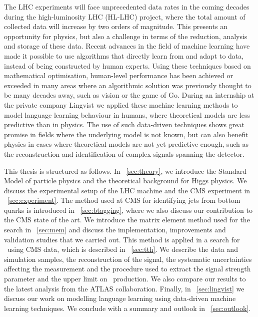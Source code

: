 The LHC experiments will face unprecedented data rates in the coming decades during the high-luminosity LHC (HL-LHC) project, where the total amount of collected data will increase by two orders of magnitude. This presents an opportunity for physics, but also a challenge in terms of the reduction, analysis and storage of these data. Recent advances in the field of machine learning have made it possible to use algorithms that directly learn from and adapt to data, instead of being constructed by human experts. Using these techniques based on mathematical optimisation, human-level performance has been achieved or exceeded in many areas where an algorithmic solution was previously thought to be many decades away, such as vision or the game of Go. During an internship at the private company Lingvist we applied these machine learning methods to model language learning behaviour in humans, where theoretical models are less predictive than in physics. The use of such data-driven techniques shows great promise in fields where the underlying model is not known, but can also benefit physics in cases where theoretical models are not yet predictive enough, such as the reconstruction and identification of complex signals spanning the detector.

This thesis is structured as follows. In ~\cref{sec:theory}, we introduce the Standard Model of particle physics and the theoretical background for Higgs physics. We discuss the experimental setup of the LHC machine and the CMS experiment in ~\cref{sec:experiment}. The method used at CMS for identifying jets from bottom quarks is introduced in ~\cref{sec:btagging}, where we also discuss our contribution to the CMS state of the art. We introduce the matrix element method used for the \ttHbb search in ~\cref{sec:mem} and discuss the implementation, improvements and validation studies that we carried out. This method is applied in a search for \ttHbb~using CMS data, which is described in ~\cref{sec:tth}. We describe the data and simulation samples, the reconstruction of the signal, the systematic uncertainties affecting the measurement and the procedure used to extract the signal strength parameter and the upper limit on \ttH~production. We also compare our results to the latest analysis from the ATLAS collaboration. Finally, in ~\cref{sec:lingvist} we discuss our work on modelling language learning using data-driven machine learning techniques. We conclude with a summary and outlook in ~\cref{sec:outlook}.

